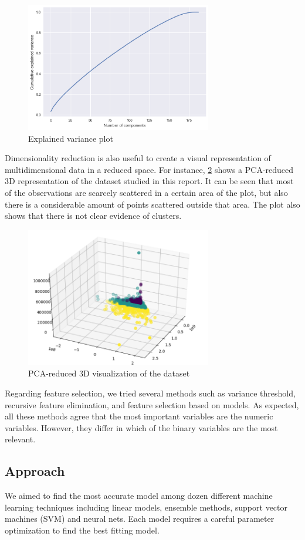 \begin{figure}[h]
\centering
\includegraphics[width=3.2in]{figures/variance}
\caption{Explained variance plot} 
\label{fig:variance}
\end{figure}

Dimensionality reduction is also useful to create a visual representation of multidimensional data in a reduced space. For instance, \figurename{} \ref{fig:pca} shows a PCA-reduced 3D representation of the dataset studied in this report. It can be seen that most of the observations are scarcely scattered in a certain area of the plot, but also there is a considerable amount of points scattered outside that area. The plot also shows that there is not clear evidence of clusters. 

\begin{figure}[h]
\centering
\includegraphics[width=3.2in]{figures/pca}
\caption{PCA-reduced 3D visualization of the dataset} 
\label{fig:pca}
\end{figure}

Regarding feature selection, we tried several methods such as variance threshold, recursive feature elimination, and feature selection based on models. As expected, all these methods agree that the most important variables are the numeric variables. However, they differ in which of the binary variables are the most relevant.

\subsection{Approach}
We aimed to find the most accurate model among dozen different machine learning techniques including linear models, ensemble methods, support vector machines (SVM) and neural nets.  Each model requires a careful parameter optimization to find the best fitting model. 

